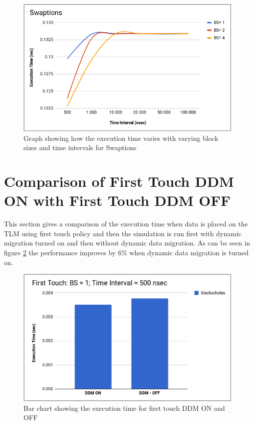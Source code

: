 \documentclass{listhesis}
\begin{document}
\begin{figure}
  \includegraphics[width=\linewidth]{Swapt_var_bs_t.png}
  \centering
  \caption{Graph showing how the execution time varies with varying block sizes and time intervals for Swaptions}
  \label{fig:Swapt_var_bs_t.png}
\end{figure}

\section{Comparison of First Touch DDM ON with First Touch DDM OFF}
This section gives a comparison of the execution time when data is placed on the TLM using first touch policy and then the simulation is run first with dynamic migration turned on and then without dynamic data migration. As can be seen in figure \ref{fig:FT_DDM_ON_OFF_BLACK.png} the performance improves by 6\% when dynamic data migration is turned on. 

\begin{figure}
  \includegraphics[width=\linewidth]{FT_DDM_ON_OFF_BLACK.png}
  \centering
  \caption{Bar chart showing the execution time for first touch DDM ON and OFF}
  \label{fig:FT_DDM_ON_OFF_BLACK.png}
\end{figure}
\end{document}
